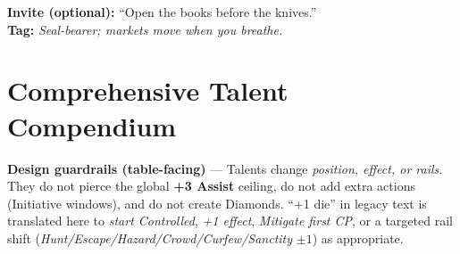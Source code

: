 \documentclass[11pt]{article}
\begin{document}
\textbf{Invite (optional):} “Open the books before the knives.”\\
\textbf{Tag:} \emph{Seal-bearer; markets move when you breathe.}

\section*{Comprehensive Talent Compendium}

\noindent
\textbf{Design guardrails (table-facing)} — Talents change \emph{position, effect, or rails}. They do not pierce the global \textbf{+3 Assist} ceiling, do not add extra actions (Initiative windows), and do not create Diamonds. “+1 die” in legacy text is translated here to \emph{start Controlled}, \emph{+1 effect}, \emph{Mitigate first CP}, or a targeted rail shift (\emph{Hunt/Escape/Hazard/Crowd/Curfew/Sanctity} $\pm1$) as appropriate.
\end{document}
